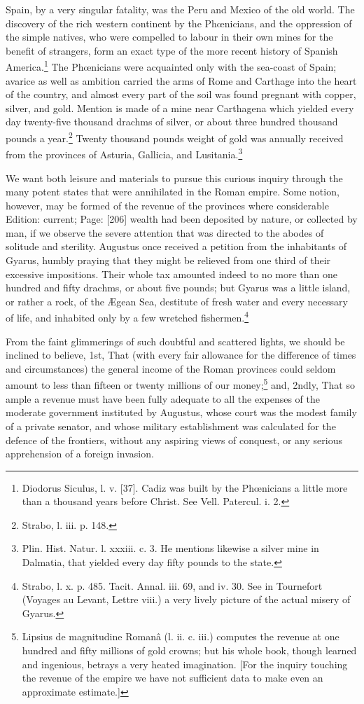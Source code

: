 Spain, by a very singular fatality, was the Peru and Mexico of the old world. The discovery of the rich western continent by the Phœnicians, and the oppression of the simple natives, who were compelled to labour in their own mines for the benefit of strangers, form an exact type of the more recent history of Spanish America.\footnote{Diodorus Siculus, l. v. [37]. Cadiz was built by the Phœnicians a little more than a thousand years before Christ. See Vell. Patercul. i. 2.} The Phœnicians were acquainted only with the sea-coast of Spain; avarice as well as ambition carried the arms of Rome and Carthage into the heart of the country, and almost every part of the soil was found pregnant with copper, silver, and gold. Mention is made of a mine near Carthagena which yielded every day twenty-five thousand drachms of silver, or about three hundred thousand pounds a year.\footnote{Strabo, l. iii. p. 148.} Twenty thousand pounds weight of gold was annually received from the provinces of Asturia, Gallicia, and Lusitania.\footnote{Plin. Hist. Natur. l. xxxiii. c. 3. He mentions likewise a silver mine in Dalmatia, that yielded every day fifty pounds to the state.}

We want both leisure and materials to pursue this curious inquiry through the many potent states that were annihilated in the Roman empire. Some notion, however, may be formed of the revenue of the provinces where considerable Edition: current; Page: [206] wealth had been deposited by nature, or collected by man, if we observe the severe attention that was directed to the abodes of solitude and sterility. Augustus once received a petition from the inhabitants of Gyarus, humbly praying that they might be relieved from one third of their excessive impositions. Their whole tax amounted indeed to no more than one hundred and fifty drachms, or about five pounds; but Gyarus was a little island, or rather a rock, of the Ægean Sea, destitute of fresh water and every necessary of life, and inhabited only by a few wretched fishermen.\footnote{Strabo, l. x. p. 485. Tacit. Annal. iii. 69, and iv. 30. See in Tournefort (Voyages au Levant, Lettre viii.) a very lively picture of the actual misery of Gyarus.}

From the faint glimmerings of such doubtful and scattered lights, we should be inclined to believe, 1st, That (with every fair allowance for the difference of times and circumstances) the general income of the Roman provinces could seldom amount to less than fifteen or twenty millions of our money;\footnote{Lipsius de magnitudine Romanâ (l. ii. c. iii.) computes the revenue at one hundred and fifty millions of gold crowns; but his whole book, though learned and ingenious, betrays a very heated imagination. [For the inquiry touching the revenue of the empire we have not sufficient data to make even an approximate estimate.]} and, 2ndly, That so ample a revenue must have been fully adequate to all the expenses of the moderate government instituted by Augustus, whose court was the modest family of a private senator, and whose military establishment was calculated for the defence of the frontiers, without any aspiring views of conquest, or any serious apprehension of a foreign invasion.

